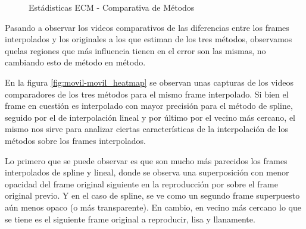 \begin{figure}[H]
    \centering
    \caption{Est\'adisticas ECM - Comparativa de M\'etodos}
    \label{fig:movil-movil_methods-mse_estadisticas}
\end{figure}

\par Pasando a observar los videos comparativos de las diferencias entre los
frames interpolados y los originales a los que estiman de los tres m\'etodos,
observamos quelas regiones que m\'as influencia tienen en el error
son las mismas, no cambiando esto de m\'etodo en m\'etodo.

\par En la figura \ref{fig:movil-movil_heatmap} se observan unas capturas de
los videos comparadores de los tres m\'etodos para el mismo frame interpolado.
Si bien el frame en cuesti\'on es interpolado con mayor precisi\'on para el m\'etodo
de spline, seguido por el de interpolaci\'on lineal y por \'ultimo por el vecino
m\'as cercano, el mismo nos sirve para analizar ciertas caracter\'isticas de
la interpolaci\'on de los m\'etodos sobre los frames interpolados.

\par Lo primero que se puede observar es que son mucho m\'as parecidos los frames
interpolados de spline y lineal, donde se observa una superposici\'on con menor
opacidad del frame original siguiente en la reproducci\'on por sobre el frame
original previo. Y en el caso de spline, se ve como un segundo frame superpuesto
a\'un menos opaco (o m\'as transparente). En cambio, en vecino m\'as cercano lo
que se tiene es el siguiente frame original a reproducir, lisa y llanamente.

